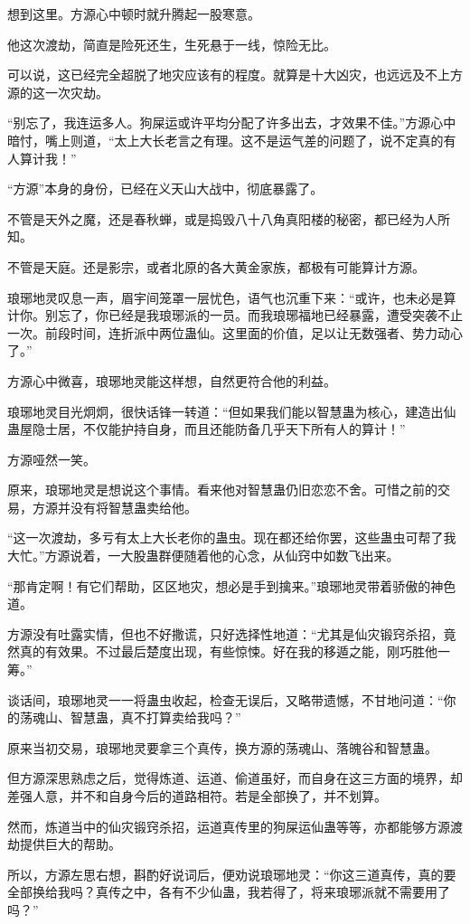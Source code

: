 \begin{this_body}
想到这里。方源心中顿时就升腾起一股寒意。

他这次渡劫，简直是险死还生，生死悬于一线，惊险无比。

可以说，这已经完全超脱了地灾应该有的程度。就算是十大凶灾，也远远及不上方源的这一次灾劫。

“别忘了，我连运多人。狗屎运或许平均分配了许多出去，才效果不佳。”方源心中暗忖，嘴上则道，“太上大长老言之有理。这不是运气差的问题了，说不定真的有人算计我！”

“方源”本身的身份，已经在义天山大战中，彻底暴露了。

不管是天外之魔，还是春秋蝉，或是捣毁八十八角真阳楼的秘密，都已经为人所知。

不管是天庭。还是影宗，或者北原的各大黄金家族，都极有可能算计方源。

琅琊地灵叹息一声，眉宇间笼罩一层忧色，语气也沉重下来：“或许，也未必是算计你。别忘了，你已经是我琅琊派的一员。而我琅琊福地已经暴露，遭受突袭不止一次。前段时间，连折派中两位蛊仙。这里面的价值，足以让无数强者、势力动心了。”

方源心中微喜，琅琊地灵能这样想，自然更符合他的利益。

琅琊地灵目光炯炯，很快话锋一转道：“但如果我们能以智慧蛊为核心，建造出仙蛊屋隐士居，不仅能护持自身，而且还能防备几乎天下所有人的算计！”

方源哑然一笑。

原来，琅琊地灵是想说这个事情。看来他对智慧蛊仍旧恋恋不舍。可惜之前的交易，方源并没有将智慧蛊卖给他。

“这一次渡劫，多亏有太上大长老你的蛊虫。现在都还给你罢，这些蛊虫可帮了我大忙。”方源说着，一大股蛊群便随着他的心念，从仙窍中如数飞出来。

“那肯定啊！有它们帮助，区区地灾，想必是手到擒来。”琅琊地灵带着骄傲的神色道。

方源没有吐露实情，但也不好撒谎，只好选择性地道：“尤其是仙灾锻窍杀招，竟然真的有效果。不过最后楚度出现，有些惊悚。好在我的移遁之能，刚巧胜他一筹。”

谈话间，琅琊地灵一一将蛊虫收起，检查无误后，又略带遗憾，不甘地问道：“你的荡魂山、智慧蛊，真不打算卖给我吗？”

原来当初交易，琅琊地灵要拿三个真传，换方源的荡魂山、落魄谷和智慧蛊。

但方源深思熟虑之后，觉得炼道、运道、偷道虽好，而自身在这三方面的境界，却差强人意，并不和自身今后的道路相符。若是全部换了，并不划算。

然而，炼道当中的仙灾锻窍杀招，运道真传里的狗屎运仙蛊等等，亦都能够方源渡劫提供巨大的帮助。

所以，方源左思右想，斟酌好说词后，便劝说琅琊地灵：“你这三道真传，真的要全部换给我吗？真传之中，各有不少仙蛊，我若得了，将来琅琊派就不需要用了吗？”


\end{this_body}
